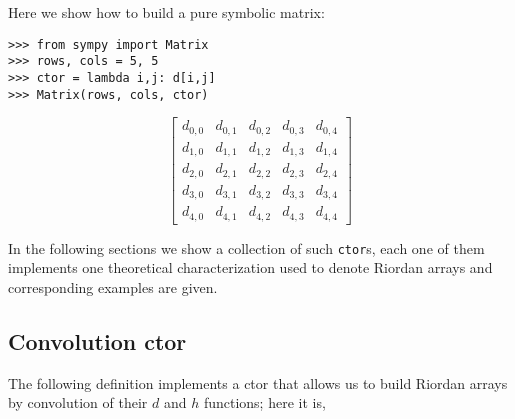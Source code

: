 Here we show how to build a pure symbolic matrix:
\begin{verbatim}
>>> from sympy import Matrix
>>> rows, cols = 5, 5
>>> ctor = lambda i,j: d[i,j]
>>> Matrix(rows, cols, ctor)
\end{verbatim}
\begin{displaymath}
\left[\begin{matrix}d_{0,0} & d_{0,1} & d_{0,2} & d_{0,3} & d_{0,4}\\d_{1,0} & d_{1,1} & d_{1,2} & d_{1,3} & d_{1,4}\\d_{2,0} & d_{2,1} & d_{2,2} & d_{2,3} & d_{2,4}\\d_{3,0} & d_{3,1} & d_{3,2} & d_{3,3} & d_{3,4}\\d_{4,0} & d_{4,1} & d_{4,2} & d_{4,3} & d_{4,4}\end{matrix}\right]
\end{displaymath}

In the following sections we show a collection of such \verb|ctor|s, each one
of them implements one theoretical characterization used to denote Riordan
arrays and corresponding examples are given.

\subsection{Convolution ctor}

The following definition implements a ctor that allows us to build Riordan
arrays by convolution of their $d$ and $h$ functions; here it is,


